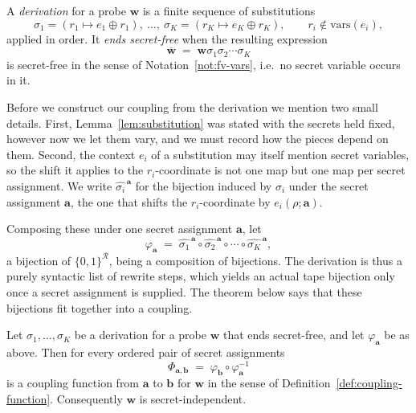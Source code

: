   \begin{definition}[Derivation]
  \label{def:derivation}
  A \emph{derivation} for a probe $\mathbf{w}$ is a finite sequence of
  substitutions
  \[
    \sigma_1 = (r_1 \mapsto e_1 \oplus r_1), \ \dots, \
    \sigma_K = (r_K \mapsto e_K \oplus r_K),
    \qquad r_i \notin \mathrm{vars}(e_i) ,
  \]
  applied in order. It \emph{ends secret-free} when the resulting expression
  \[
    \overline{\mathbf{w}} \;=\; \mathbf{w}\sigma_1 \sigma_2 \cdots \sigma_K
  \]
  is secret-free in the sense of Notation~\ref{not:fv-vars}, i.e.\ no secret
  variable occurs in it.
  \end{definition}

  Before we construct our coupling from the derivation we mention two small details.
  First, Lemma~\ref{lem:substitution} was stated with the secrets held fixed, however now
  we let them vary, and we must record how the pieces depend on them. Second, the
  context $e_i$ of a substitution may itself mention secret variables, so the shift
  it applies to the $r_i$-coordinate is not one map but one map per secret
  assignment. We write $\widehat{\sigma_i}^{\,\mathbf{a}}$ for the bijection
  induced by $\sigma_i$ under the secret assignment $\mathbf{a}$, the one that
  shifts the $r_i$-coordinate by $e_i(\rho; \mathbf{a})$.

  Composing these under one secret assignment $\mathbf{a}$, let
  \[
    \varphi_{\mathbf{a}} \;=\; \widehat{\sigma_1}^{\,\mathbf{a}} \circ
      \widehat{\sigma_2}^{\,\mathbf{a}} \circ \cdots \circ
      \widehat{\sigma_K}^{\,\mathbf{a}} ,
  \]
  a bijection of $\{0,1\}^{\mathcal{R}}$, being a composition of bijections. The
  derivation is thus a purely syntactic list of rewrite steps,
  which yields an actual tape bijection only once a secret assignment is supplied.
  The theorem below says that these bijections fit together into a coupling.

  \begin{theorem}
  \label{thm:derivation-coupling}
  Let $\sigma_1, \dots, \sigma_K$ be a derivation for a probe $\mathbf{w}$ that
  ends secret-free, and let $\varphi_{\mathbf{a}}$ be as above. Then for every
  ordered pair of secret assignments
  \[
    \Phi_{\mathbf{a},\mathbf{b}} \;=\; \varphi_{\mathbf{b}} \circ
      \varphi_{\mathbf{a}}^{-1}
  \]
  is a coupling function from $\mathbf{a}$ to $\mathbf{b}$ for $\mathbf{w}$ in the
  sense of Definition~\ref{def:coupling-function}. Consequently $\mathbf{w}$ is
  secret-independent.
  \end{theorem}

